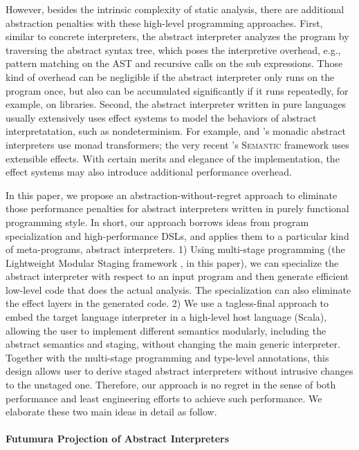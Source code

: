 However, besides the intrinsic complexity of static analysis, there are
additional abstraction penalties with these high-level programming approaches.
First, similar to concrete interpreters, the abstract interpreter analyzes the
program by traversing the abstract syntax tree, which poses the interpretive
overhead, e.g., pattern matching on the AST and recursive calls on the sub
expressions. Those kind of overhead can be negligible if the abstract
interpreter only runs on the program once, but also can be accumulated
significantly if it runs repeatedly, for example, on libraries. Second, the
abstract interpreter written in pure languages usually extensively uses effect
systems to model the behaviors of abstract interpretatation, such as
nondeterminism. For example, \citet{DBLP:journals/pacmpl/DaraisLNH17} and
\citet{Sergey:2013:MAI:2491956.2491979}'s monadic abstract interpreters use
monad transformers; the very recent \citet{Githubsemantic}'s \textsc{Semantic} framework
uses extensible effects. With certain merits and elegance of the implementation,
the effect systems may also introduce additional performance overhead.

In this paper, we propose an abstraction-without-regret approach to
eliminate those performance penalties for abstract interpreters
written in purely functional programming style. In short, our approach
borrows ideas from program specialization and high-performance DSLs,
and applies them to a particular kind of meta-programs, abstract
interpreters.
1) Using multi-stage programming (the Lightweight Modular Staging
framework \cite{DBLP:conf/gpce/RompfO10}, in this paper), we can
specialize the abstract interpreter with respect to an input program
and then generate efficient low-level code that does the actual
analysis. The specialization can also eliminate the effect layers in the generated code.
2) We use a tagless-final approach to embed the target
language interpreter in a high-level host language (Scala), allowing
the user to implement different semantics modularly, including the
abstract semantics and staging, without changing the main generic
interpreter. Together with the multi-stage programming and type-level
annotations, this design allows user to derive staged abstract
interpreters without intrusive changes to the unstaged one. Therefore,
our approach is no regret in the sense of both performance and least
engineering efforts to achieve such performance. We elaborate these
two main ideas in detail as follow.

\paragraph{Futumura Projection of Abstract Interpreters}

